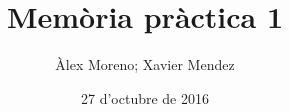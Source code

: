 \documentclass[catalan,parskip=half*,oneside,DIV=12,hidelinks]{scrreprt}
\begin{document}
\title{Memòria pràctica 1}
\date{27 d'octubre de 2016}
\author{Àlex Moreno; Xavier Mendez}

\maketitle

\tableofcontents
\clearpage


\newcommand{\cclearpage}{}
\newcommand{\projectname}{}
\newcommand{\inputproject}[1]{
  \renewcommand{\projectname}{#1}
  
}
\inputproject{1A}
\inputproject{1B}
\appendix
\inputproject{1A-extra1}
\inputproject{1B-extra1}
\inputproject{1B-extra2}
\end{document}
